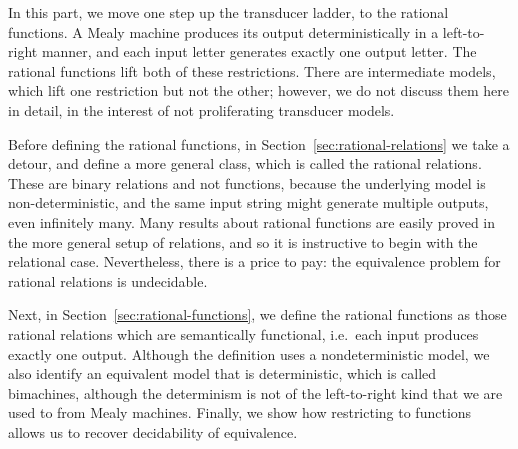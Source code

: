 In this part, we move one step up the transducer ladder, to the rational functions.
A Mealy machine produces its output deterministically in a left-to-right manner, and each input letter generates exactly one output letter. The rational functions lift both of these restrictions. There are intermediate models, which lift one restriction but not the other; however, we do not discuss them here in detail, in the interest of not proliferating transducer models.

Before defining the rational functions, in Section~\ref{sec:rational-relations} we take a detour, and   define a more general class, which is called the rational relations. These are binary relations and not functions, because the underlying model is non-deterministic, and the same input string might generate multiple outputs, even infinitely many. Many results about rational functions are easily proved in the more general setup of relations, and so it is instructive to begin with the relational case. Nevertheless, there is a price to pay: the equivalence problem for rational relations is undecidable.

Next, in Section~\ref{sec:rational-functions}, we define the rational functions as those rational relations which are semantically functional, i.e.~each input produces exactly one output. Although the definition uses a nondeterministic model, we also identify an equivalent model that is deterministic, which is called bimachines, although the determinism is not of the left-to-right kind that we are used to from Mealy machines. Finally, we show how restricting to functions allows us to recover decidability of equivalence. 

